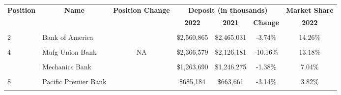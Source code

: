 \begin{table}
\centering
\begin{tabular}{llccccc}
\toprule
\multicolumn{1}{c}{\textbf{Position}} & \multicolumn{1}{c}{\textbf{Name}} & \multicolumn{1}{c}{\textbf{Position Change}} & \multicolumn{3}{c}{\textbf{Deposit (in thousands)}} & \multicolumn{1}{c}{\textbf{Market Share}} \\
\cmidrule(l{3pt}r{3pt}){1-1} \cmidrule(l{3pt}r{3pt}){2-2} \cmidrule(l{3pt}r{3pt}){3-3} \cmidrule(l{3pt}r{3pt}){4-6} \cmidrule(l{3pt}r{3pt}){7-7}
\multicolumn{3}{c}{\textbf{ }} & \multicolumn{1}{c}{\textbf{2022}} & \multicolumn{1}{c}{\textbf{2021}} & \multicolumn{1}{c}{\textbf{Change}} & \multicolumn{1}{c}{\textbf{2022}} \\
\cmidrule(l{3pt}r{3pt}){4-4} \cmidrule(l{3pt}r{3pt}){5-5} \cmidrule(l{3pt}r{3pt}){6-6} \cmidrule(l{3pt}r{3pt}){7-7}
\cellcolor{gray!6}{1} & \cellcolor{gray!6}{Wells Fargo} & \cellcolor{gray!6}{} & \cellcolor{gray!6}{\$3,058,799} & \cellcolor{gray!6}{\$3,048,912} & \cellcolor{gray!6}{-0.32\%} & \cellcolor{gray!6}{17.04\%}\\
2 & Bank of America &  & \$2,560,865 & \$2,465,031 & -3.74\% & 14.26\%\\
\cellcolor{gray!6}{3} & \cellcolor{gray!6}{JPMorgan Chase Bank} & \cellcolor{gray!6}{+1} & \cellcolor{gray!6}{\$2,404,277} & \cellcolor{gray!6}{\$2,317,967} & \cellcolor{gray!6}{-3.59\%} & \cellcolor{gray!6}{13.39\%}\\
4 & Mufg Union Bank & NA & \$2,366,579 & \$2,126,181 & -10.16\% & 13.18\%\\
\cellcolor{gray!6}{5} & \cellcolor{gray!6}{Montecito Bank \& Trust} & \cellcolor{gray!6}{} & \cellcolor{gray!6}{\$1,970,211} & \cellcolor{gray!6}{\$1,715,921} & \cellcolor{gray!6}{-12.91\%} & \cellcolor{gray!6}{10.97\%}\\
\addlinespace
6 & Mechanics Bank &  & \$1,263,690 & \$1,246,275 & -1.38\% & 7.04\%\\
\cellcolor{gray!6}{7} & \cellcolor{gray!6}{American Riviera Bank} & \cellcolor{gray!6}{} & \cellcolor{gray!6}{\$871,855} & \cellcolor{gray!6}{\$759,516} & \cellcolor{gray!6}{-12.89\%} & \cellcolor{gray!6}{4.86\%}\\
8 & Pacific Premier Bank &  & \$685,184 & \$663,661 & -3.14\% & 3.82\%\\
\cellcolor{gray!6}{9} & \cellcolor{gray!6}{First Republic Bank} & \cellcolor{gray!6}{+1} & \cellcolor{gray!6}{\$669,765} & \cellcolor{gray!6}{\$568,485} & \cellcolor{gray!6}{-15.12\%} & \cellcolor{gray!6}{3.73\%}\\

\end{tabular}
\end{table}
